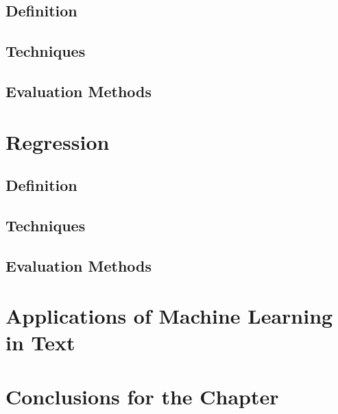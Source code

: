 \subsection{Definition}

\subsection{Techniques}

\subsection{Evaluation Methods}


\section{Regression}

\subsection{Definition}

\subsection{Techniques}

\subsection{Evaluation Methods}



\section{Applications of Machine Learning in Text}

% 

\section{Conclusions for the Chapter}
